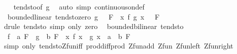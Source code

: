 \begin{isabellebody}
%
\isadelimproof
\ \ %
\endisadelimproof
%
\isatagproof
{}\isamarkupfalse%
\ tendsto{\isacharbrackleft}{\kern0pt}of\ g{\isacharbrackright}{\kern0pt}\ \isamarkupfalse%
\ {\isacharparenleft}{\kern0pt}auto\ simp{\isacharcolon}{\kern0pt}\ continuous{\isacharunderscore}{\kern0pt}on{\isacharunderscore}{\kern0pt}def{\isacharparenright}{\kern0pt}%
\endisatagproof
{\isafoldproof}%
%
\isadelimproof
\isanewline
%
\endisadelimproof
\isanewline
{}\isamarkupfalse%
\ {\isacharparenleft}{\kern0pt}\ bounded{\isacharunderscore}{\kern0pt}linear{\isacharparenright}{\kern0pt}\ tendsto{\isacharunderscore}{\kern0pt}zero{\isacharcolon}{\kern0pt}\ {\isachardoublequoteopen}{\isacharparenleft}{\kern0pt}g\ {\isasymlonglongrightarrow}\ {}{\isacharparenright}{\kern0pt}\ F\ {\isasymLongrightarrow}\ {\isacharparenleft}{\kern0pt}{\isacharparenleft}{\kern0pt}{\isasymlambda}x{\isachardot}{\kern0pt}\ f\ {\isacharparenleft}{\kern0pt}g\ x{\isacharparenright}{\kern0pt}{\isacharparenright}{\kern0pt}\ {\isasymlonglongrightarrow}\ {}{\isacharparenright}{\kern0pt}\ F{\isachardoublequoteclose}\isanewline
%
\isadelimproof
\ \ %
\endisadelimproof
%
\isatagproof
{}\isamarkupfalse%
\ {\isacharparenleft}{\kern0pt}drule\ tendsto{\isacharparenright}{\kern0pt}\ {\isacharparenleft}{\kern0pt}simp\ only{\isacharcolon}{\kern0pt}\ zero{\isacharparenright}{\kern0pt}%
\endisatagproof
{\isafoldproof}%
%
\isadelimproof
\isanewline
%
\endisadelimproof
\isanewline
{}\isamarkupfalse%
\ {\isacharparenleft}{\kern0pt}\ bounded{\isacharunderscore}{\kern0pt}bilinear{\isacharparenright}{\kern0pt}\ tendsto{\isacharcolon}{\kern0pt}\isanewline
\ \ {\isachardoublequoteopen}{\isacharparenleft}{\kern0pt}f\ {\isasymlonglongrightarrow}\ a{\isacharparenright}{\kern0pt}\ F\ {\isasymLongrightarrow}\ {\isacharparenleft}{\kern0pt}g\ {\isasymlonglongrightarrow}\ b{\isacharparenright}{\kern0pt}\ F\ {\isasymLongrightarrow}\ {\isacharparenleft}{\kern0pt}{\isacharparenleft}{\kern0pt}{\isasymlambda}x{\isachardot}{\kern0pt}\ f\ x\ {\isacharasterisk}{\kern0pt}{\isacharasterisk}{\kern0pt}\ g\ x{\isacharparenright}{\kern0pt}\ {\isasymlonglongrightarrow}\ a\ {\isacharasterisk}{\kern0pt}{\isacharasterisk}{\kern0pt}\ b{\isacharparenright}{\kern0pt}\ F{\isachardoublequoteclose}\isanewline
%
\isadelimproof
\ \ %
\endisadelimproof
%
\isatagproof
{}\isamarkupfalse%
\ {\isacharparenleft}{\kern0pt}simp\ only{\isacharcolon}{\kern0pt}\ tendsto{\isacharunderscore}{\kern0pt}Zfun{\isacharunderscore}{\kern0pt}iff\ prod{\isacharunderscore}{\kern0pt}diff{\isacharunderscore}{\kern0pt}prod\ Zfun{\isacharunderscore}{\kern0pt}add\ Zfun\ Zfun{\isacharunderscore}{\kern0pt}left\ Zfun{\isacharunderscore}{\kern0pt}right{\isacharparenright}{\kern0pt}%

\end{isabellebody}
